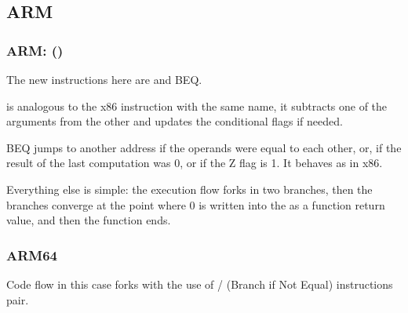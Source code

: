 \subsection{ARM}

\subsubsection{ARM: \OptimizingKeilVI (\ThumbMode)}




The new instructions here are \CMP and \ac{BEQ}.

\CMP is analogous to the x86 instruction with the same name, it subtracts one of the arguments from the other and updates the conditional flags if needed.

\ac{BEQ} jumps to another address if the operands were equal to each other, or,
if the result of the last computation was 0, or if the Z flag is 1.
It behaves as \JZ in x86.

Everything else is simple: the execution flow forks in two branches, then the branches
converge at the point where 0 is written into the  as a function return value, and then the function ends.

\subsubsection{ARM64}



Code flow in this case forks with the use of / (Branch if Not Equal) instructions pair.

